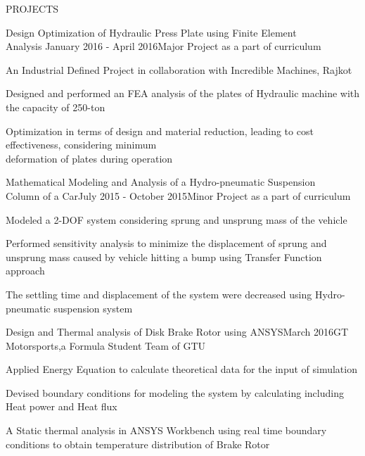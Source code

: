 \documentclass{resume} %
\begin{document}

\begin{rSection}{PROJECTS}

\begin{rSubsection}{Design Optimization of Hydraulic Press Plate using Finite Element
\\Analysis} {January 2016 - April 2016}{Major Project as a part of curriculum}{}

\item An Industrial Defined Project in collaboration with Incredible Machines, Rajkot
\item Designed and performed an FEA analysis of the plates of Hydraulic machine with the capacity of 250-ton    
\item Optimization in terms of design and material reduction, leading to cost effectiveness, considering minimum \\deformation of plates during operation 
 
\end{rSubsection}  


\begin{rSubsection}{Mathematical Modeling and Analysis of a Hydro-pneumatic Suspension
\\Column of a Car}{July 2015 - October 2015}{Minor Project as a part of curriculum}{} 
\item Modeled a 2-DOF system considering sprung and unsprung mass of the vehicle
\item Performed sensitivity analysis to minimize the displacement of sprung and unsprung mass caused by vehicle hitting a bump using Transfer Function approach  
\item The settling time and displacement of the system were decreased using Hydro-pneumatic suspension system   

\end{rSubsection}



\begin{rSubsection}{Design and Thermal analysis of Disk Brake Rotor using ANSYS}{March 2016}{GT Motorsports,a Formula Student Team of GTU}{}

\item Applied Energy Equation to calculate theoretical data for the input of simulation
\item Devised boundary conditions for modeling the system by calculating including Heat power and Heat flux    
\item A Static thermal analysis in ANSYS Workbench using real time boundary conditions to obtain temperature distribution of Brake Rotor  


\end{rSubsection}
\end{rSection}
\end{document}
